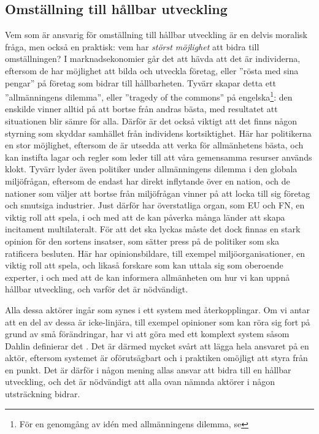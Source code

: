 \documentclass{article}
\begin{document}
\subsection{Omställning till hållbar utveckling}
Vem som är ansvarig för omställning till hållbar utveckling är en delvis moralisk fråga, men också en praktisk: vem har \emph{störst möjlighet} att bidra till omställningen? I marknadsekonomier går det att hävda att det är individerna, eftersom de har möjlighet att bilda och utveckla företag, eller ''rösta med sina pengar'' på företag som bidrar till hållbarheten. Tyvärr skapar detta ett ''allmänningens dilemma'', eller ''tragedy of the commons'' på engelska\footnote{För en genomgång av idén med allmänningens dilemma, se }: den enskilde vinner alltid på att bortse från andras bästa, med resultatet att situationen blir sämre för alla. Därför är det också viktigt att det finns någon styrning som skyddar samhället från individens kortsiktighet. Här har politikerna en stor möjlighet, eftersom de är utsedda att verka för allmänhetens bästa, och kan instifta lagar och regler som leder till att våra gemensamma resurser används klokt. Tyvärr lyder även politiker under allmänningens dilemma i den globala miljöfrågan, eftersom de endast har direkt inflytande över en nation, och de nationer som väljer att bortse från miljöfrågan vinner på att locka till sig företag och smutsiga industrier. Just därför har överstatliga organ, som EU och FN, en viktig roll att spela, i och med att de kan påverka många länder att skapa incitament multilateralt. För att det ska lyckas måste det dock finnas en stark opinion för den sortens insatser, som sätter press på de politiker som ska ratificera besluten. Här har opinionsbildare, till exempel miljöorganisationer, en viktig roll att spela, och likaså forskare som kan uttala sig som oberoende experter, i och med att de kan informera allmänheten om hur vi kan uppnå hållbar utveckling, och varför det är nödvändigt.

Alla dessa aktörer ingår som synes i ett system med återkopplingar. Om vi antar att en del av dessa är icke-linjära, till exempel opinioner som kan röra sig fort på grund av små förändringar, har vi att göra med ett komplext system såsom Dahlin definierar det . Det är därmed mycket svårt att lägga hela ansvaret på en aktör, eftersom systemet är oförutsägbart och i praktiken omöjligt att styra från en punkt. Det är därför i någon mening allas ansvar att bidra till en hållbar utveckling, och det är nödvändigt att alla ovan nämnda aktörer i någon utsträckning bidrar.

\end{document}
